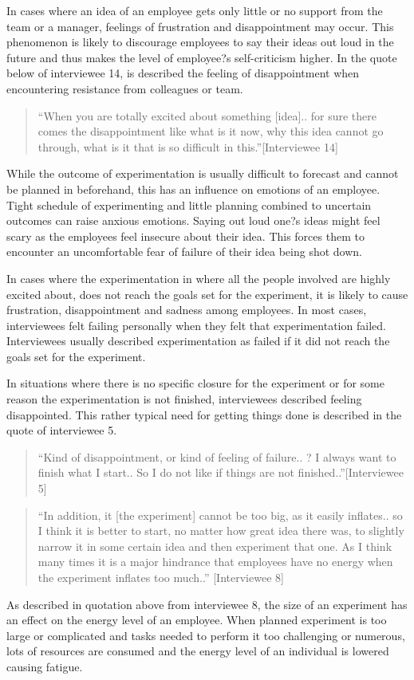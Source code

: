 In cases where an idea of an employee gets only little or no support from the team or a manager, feelings of frustration and disappointment may occur. This phenomenon is likely to discourage employees to say their ideas out loud in the future and thus makes the level of employee?s self-criticism higher. In the quote below of interviewee 14, is described the feeling of disappointment when encountering resistance from colleagues or team.
\begin{quote}
``When you are totally excited about something [idea].. for sure there comes the disappointment like what is it now, why this idea cannot go through, what is it that is so difficult in this.''[Interviewee 14]
\end{quote}
While the outcome of experimentation is usually difficult to forecast and cannot be planned in beforehand, this has an influence on emotions of an employee. Tight schedule of experimenting and little planning combined to uncertain outcomes can raise anxious emotions. Saying out loud one?s ideas might feel scary as the employees feel insecure about their idea. This forces them to encounter an uncomfortable fear of failure of their idea being shot down. 

In cases where the experimentation in where all the people involved are highly excited about, does not reach the goals set for the experiment, it is likely to cause frustration, disappointment and sadness among employees. In most cases, interviewees felt failing personally when they felt that experimentation failed. Interviewees usually described experimentation as failed if it did not reach the goals set for the experiment. 

In situations where there is no specific closure for the experiment or for some reason the experimentation is not finished, interviewees described feeling disappointed. This rather typical need for getting things done is described in the quote of interviewee 5.
 \begin{quote}
``Kind of disappointment, or kind of feeling of failure.. ? I always want to finish what I start.. So I do not like if things are not finished..''[Interviewee 5]
\end{quote}
\begin{quote}
``In addition, it [the experiment] cannot be too big, as it easily inflates.. so I think it is better to start, no matter how great idea there was, to slightly narrow it in some certain idea and then experiment that one. As I think many times it is a major hindrance that employees have no energy when the experiment inflates too much..'' [Interviewee 8]
\end{quote}
As described in quotation above from interviewee 8, the size of an experiment has an effect on the energy level of an employee. When planned experiment is too large or complicated and tasks needed to perform it too challenging or numerous, lots of resources are consumed and the energy level of an individual is lowered causing fatigue. 

